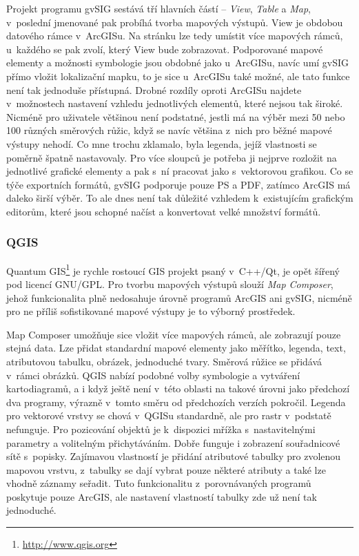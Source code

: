 \documentclass[a4paper,12pt,draft]{article}
\begin{document}
Projekt programu gvSIG sestává tří hlavních částí -- \emph{View},
\emph{Table} a \emph{Map}, v~poslední jmenované pak probíhá tvorba
mapových výstupů. View je obdobou datového rámce v~ArcGISu. Na stránku
lze tedy umístit více mapových rámců, u~každého se pak zvolí,
který View bude zobrazovat. Podporované mapové elementy a možnosti
symbologie jsou obdobné
jako u~ArcGISu, navíc umí gvSIG přímo vložit lokalizační mapku,
to je sice u~ArcGISu také možné, ale tato funkce není tak jednoduše
přístupná. Drobné rozdíly oproti ArcGISu najdete v~možnostech nastavení
vzhledu
jednotlivých elementů, které nejsou tak široké. Nicméně pro uživatele
většinou
není podstatné, jestli má na výběr mezi 50 nebo 100 různých směrových
růžic,
když se navíc  většina z~nich  pro běžné mapové výstupy nehodí.
Co mne trochu zklamalo,
byla legenda, jejíž vlastnosti se poměrně špatně nastavovaly. Pro
více sloupců je potřeba ji nejprve rozložit na jednotlivé grafické
elementy a pak s~ní pracovat jako s~vektorovou grafikou. Co se týče
exportních formátů, gvSIG podporuje pouze PS a PDF, zatímco ArcGIS
má daleko širší výběr. To ale dnes není tak důležité vzhledem
k~existujícím grafickým editorům, které jsou schopné načíst a
konvertovat velké množství formátů.

\subsubsection{QGIS}
\label{sec:porovnani_moznosti:QGIS}
Quantum GIS\footnote{\url{http://www.qgis.org}} je rychle rostoucí GIS projekt
psaný v~C++/Qt, je opět šířený
pod licencí GNU/GPL. Pro tvorbu mapových výstupů slouží \emph{Map
Composer}, jehož funkcionalita plně nedosahuje úrovně programů ArcGIS
ani gvSIG, nicméně pro ne příliš sofistikované mapové výstupy je to
výborný prostředek.

Map Composer umožňuje sice vložit více mapových rámců, ale
zobrazují pouze stejná data. Lze přidat standardní mapové elementy
jako měřítko, legenda, text, atributovou tabulku, obrázek, jednoduché
tvary. Směrová růžice se přidává v~rámci obrázků.
QGIS nabízí podobné volby symbologie a vytváření kartodiagramů,
a i když
ještě není v~této oblasti na takové úrovni jako předchozí dva
programy, výrazně
v~tomto směru od předchozích verzích pokročil.
Legenda pro vektorové vrstvy se chová v~QGISu standardně, ale
pro rastr v~podstatě nefunguje. Pro pozicování objektů je k~dispozici
mřížka s~nastavitelnými parametry a volitelným přichytáváním. Dobře
funguje i zobrazení souřadnicové sítě s~popisky. Zajímavou
vlastností je přidání atributové tabulky pro zvolenou mapovou
vrstvu, z~tabulky se dají vybrat pouze některé atributy a také lze
vhodně záznamy seřadit. Tuto funkcionalitu z~porovnávaných programů
poskytuje pouze ArcGIS, ale nastavení vlastností tabulky zde už není
tak jednoduché.
\end{document}
